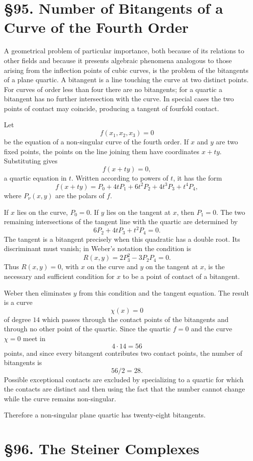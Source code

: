 \documentclass[11pt,a4paper]{book}
\newcommand{\webersection}[2]{\clearpage\section*{\S #1. #2}}
\begin{document}
\webersection{95}{Number of Bitangents of a Curve of the Fourth Order}

A geometrical problem of particular importance, both because of its relations to other fields and because it presents algebraic phenomena analogous to those arising from the inflection points of cubic curves, is the problem of the bitangents of a plane quartic.  A bitangent is a line touching the curve at two distinct points.  For curves of order less than four there are no bitangents; for a quartic a bitangent has no further intersection with the curve.  In special cases the two points of contact may coincide, producing a tangent of fourfold contact.

Let
\[
f(x_1,x_2,x_3)=0
\]
be the equation of a non-singular curve of the fourth order.  If \(x\) and \(y\) are two fixed points, the points on the line joining them have coordinates \(x+ty\).  Substituting gives
\[
f(x+ty)=0,
\]
a quartic equation in \(t\).  Written according to powers of \(t\), it has the form
\[
f(x+ty)=P_0+4tP_1+6t^2P_2+4t^3P_3+t^4P_4,
\]
where \(P_\nu(x,y)\) are the polars of \(f\).

If \(x\) lies on the curve, \(P_0=0\).  If \(y\) lies on the tangent at \(x\), then \(P_1=0\).  The two remaining intersections of the tangent line with the quartic are determined by
\[
6P_2+4tP_3+t^2P_4=0.
\]
The tangent is a bitangent precisely when this quadratic has a double root.  Its discriminant must vanish; in Weber's notation the condition is
\[
R(x,y)=2P_3^2-3P_2P_4=0.
\]
Thus \(R(x,y)=0\), with \(x\) on the curve and \(y\) on the tangent at \(x\), is the necessary and sufficient condition for \(x\) to be a point of contact of a bitangent.

Weber then eliminates \(y\) from this condition and the tangent equation.  The result is a curve
\[
\chi(x)=0
\]
of degree \(14\) which passes through the contact points of the bitangents and through no other point of the quartic.  Since the quartic \(f=0\) and the curve \(\chi=0\) meet in
\[
4\cdot14=56
\]
points, and since every bitangent contributes two contact points, the number of bitangents is
\[
56/2=28.
\]
Possible exceptional contacts are excluded by specializing to a quartic for which the contacts are distinct and then using the fact that the number cannot change while the curve remains non-singular.

Therefore a non-singular plane quartic has twenty-eight bitangents.

\webersection{96}{The Steiner Complexes}
\end{document}
